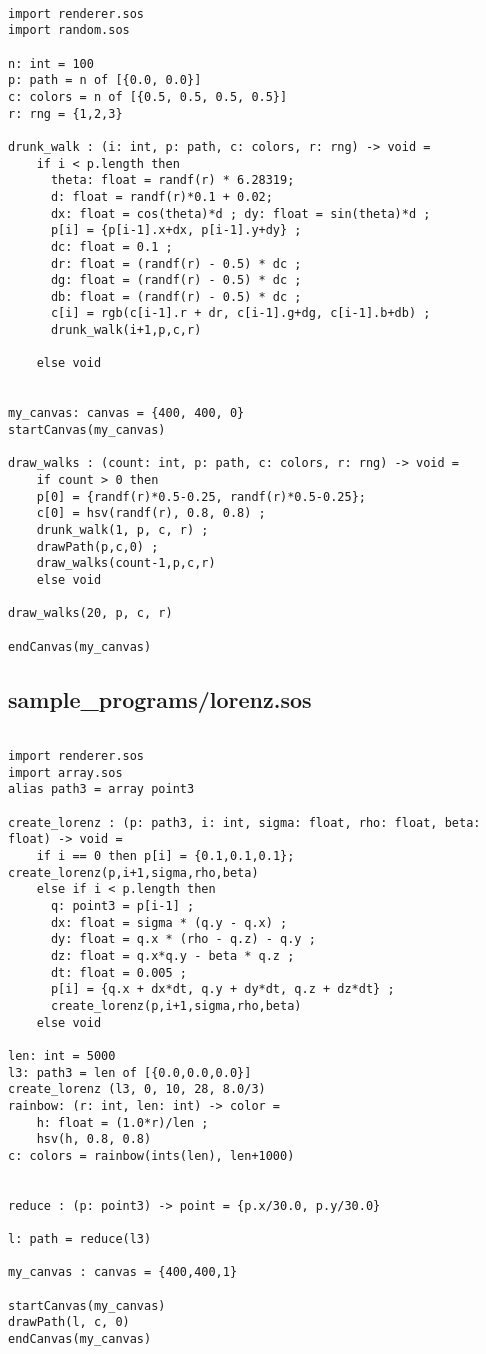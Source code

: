 \documentclass[main.tex]{subfiles}
\begin{document}
\begin{lstlisting}

import renderer.sos
import random.sos

n: int = 100
p: path = n of [{0.0, 0.0}]
c: colors = n of [{0.5, 0.5, 0.5, 0.5}]
r: rng = {1,2,3}

drunk_walk : (i: int, p: path, c: colors, r: rng) -> void = 
    if i < p.length then
      theta: float = randf(r) * 6.28319;
      d: float = randf(r)*0.1 + 0.02;
      dx: float = cos(theta)*d ; dy: float = sin(theta)*d ;
      p[i] = {p[i-1].x+dx, p[i-1].y+dy} ;
      dc: float = 0.1 ; 
      dr: float = (randf(r) - 0.5) * dc ;
      dg: float = (randf(r) - 0.5) * dc ;
      db: float = (randf(r) - 0.5) * dc ;
      c[i] = rgb(c[i-1].r + dr, c[i-1].g+dg, c[i-1].b+db) ;
      drunk_walk(i+1,p,c,r)

    else void


my_canvas: canvas = {400, 400, 0}
startCanvas(my_canvas)

draw_walks : (count: int, p: path, c: colors, r: rng) -> void =
    if count > 0 then
    p[0] = {randf(r)*0.5-0.25, randf(r)*0.5-0.25};
    c[0] = hsv(randf(r), 0.8, 0.8) ;
    drunk_walk(1, p, c, r) ;
    drawPath(p,c,0) ;
    draw_walks(count-1,p,c,r)
    else void

draw_walks(20, p, c, r)

endCanvas(my_canvas)

\end{lstlisting}

\subsection{sample\_programs/lorenz.sos}

\begin{lstlisting}

import renderer.sos
import array.sos
alias path3 = array point3

create_lorenz : (p: path3, i: int, sigma: float, rho: float, beta: float) -> void = 
    if i == 0 then p[i] = {0.1,0.1,0.1}; create_lorenz(p,i+1,sigma,rho,beta)
    else if i < p.length then
      q: point3 = p[i-1] ;
      dx: float = sigma * (q.y - q.x) ;
      dy: float = q.x * (rho - q.z) - q.y ;
      dz: float = q.x*q.y - beta * q.z ;
      dt: float = 0.005 ;
      p[i] = {q.x + dx*dt, q.y + dy*dt, q.z + dz*dt} ;
      create_lorenz(p,i+1,sigma,rho,beta)
    else void

len: int = 5000
l3: path3 = len of [{0.0,0.0,0.0}]
create_lorenz (l3, 0, 10, 28, 8.0/3)
rainbow: (r: int, len: int) -> color = 
    h: float = (1.0*r)/len ;
    hsv(h, 0.8, 0.8)
c: colors = rainbow(ints(len), len+1000)


reduce : (p: point3) -> point = {p.x/30.0, p.y/30.0}

l: path = reduce(l3)

my_canvas : canvas = {400,400,1}

startCanvas(my_canvas)
drawPath(l, c, 0)
endCanvas(my_canvas)

\end{lstlisting}
\end{document}
